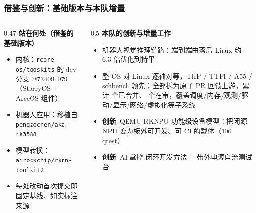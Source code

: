 \documentclass[aspectratio=169,11pt]{ctexbeamer}
\newcommand{\headline}[1]{{\sffamily\bfseries\color{teal}#1}}
\begin{document}
\begin{frame}
  \frametitle{借鉴与创新：基础版本与本队增量}
  \begin{columns}[T]
    \begin{column}{0.47\textwidth}
      {\headline{站在何处（借鉴的基础版本）}}\smallskip
      \begin{itemize}
        \item 内核：\texttt{rcore-os/tgoskits} 的 dev 分支 @73409e079（StarryOS + ArceOS 组件）
        \item 机器人应用：移植自 \texttt{pengzechen/aka-rk3588}
        \item 模型转换：\texttt{airockchip/rknn-toolkit2}
        \item 每处改动首次提交即固定基线、如实标注来源
      \end{itemize}
    \end{column}
    \begin{column}{0.5\textwidth}
      {\headline{本队的创新与增量工作}}\smallskip
      \begin{itemize}
        \item 机器人视觉推理链路：端到端由落后 Linux 约 6.3 倍优化到持平
        \item 整 OS 对 Linux 逐轴对等，THP / TTFI / A55 / schbench 领先；全部拆为原子 PR 回馈上游，累计 \nPRMerged{} 个已合并、\nPRInflight{} 个在审，覆盖调度/内存/观测/驱动/显示/网络/虚拟化等子系统
        \item \headline{创新}\ QEMU RKNPU 功能级设备模型：把闭源 NPU 变为板外可开发、可 CI 的载体（106 qtest）
        \item \headline{创新}\ AI 掌控-闭环开发方法 + 带外电源自治测试台
      \end{itemize}
    \end{column}
  \end{columns}
\end{frame}
\end{document}
